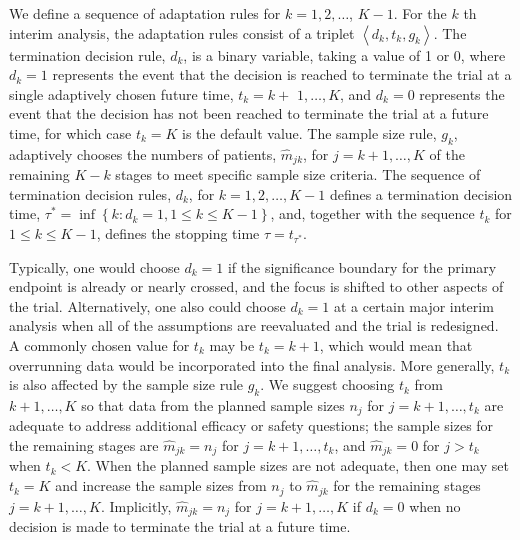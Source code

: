 \documentclass[10pt]{article}
\begin{document}
We define a sequence of adaptation rules for $k=1,2, \ldots$, $K-1$. For the $k$ th interim analysis, the adaptation rules consist of a triplet $\left\langle d_{k}, t_{k}, g_{k}\right\rangle$. The termination decision rule, $d_{k}$, is a binary variable, taking a value of 1 or 0, where $d_{k}=1$ represents the event that the decision is reached to terminate the trial at a single adaptively chosen future time, $t_{k}=k+$ $1, \ldots, K$, and $d_{k}=0$ represents the event that the decision has not been reached to terminate the trial at a future time, for which case $t_{k}=K$ is the default value. The sample size rule, $g_{k}$, adaptively chooses the numbers of patients, $\hat{m}_{j k}$, for $j=k+1, \ldots, K$ of the remaining $K-k$ stages to meet specific sample size criteria. The sequence of termination decision rules, $d_{k}$, for $k=1,2, \ldots, K-1$ defines a termination decision time, $\tau^{*}=\inf \left\{k: d_{k}=1,1 \leq k \leq K-1\right\}$, and, together with the sequence $t_{k}$ for $1 \leq k \leq K-1$, defines the stopping time $\tau=t_{\tau^{*}}$.

Typically, one would choose $d_{k}=1$ if the significance boundary for the primary endpoint is already or nearly crossed, and the focus is shifted to other aspects of the trial. Alternatively, one also could choose $d_{k}=1$ at a certain major interim analysis when all of the assumptions are reevaluated and the trial is redesigned. A commonly chosen value for $t_{k}$ may be $t_{k}=k+1$, which would mean that overrunning data would be incorporated into the final analysis. More generally, $t_{k}$ is also affected by the sample size rule $g_{k}$. We suggest choosing $t_{k}$ from $k+1, \ldots, K$ so that data from the planned sample sizes $n_{j}$ for $j=k+1, \ldots, t_{k}$ are adequate to address additional efficacy or safety questions; the sample sizes for the remaining stages are $\hat{m}_{j k}=n_{j}$ for $j=k+1, \ldots, t_{k}$, and $\hat{m}_{j k}=0$ for $j>t_{k}$ when $t_{k}<K$. When the planned sample sizes are not adequate, then one may set $t_{k}=K$ and increase the sample sizes from $n_{j}$ to $\hat{m}_{j k}$ for the remaining stages $j=k+1, \ldots, K$. Implicitly, $\hat{m}_{j k}=n_{j}$ for $j=k+1, \ldots, K$ if $d_{k}=0$ when no decision is made to terminate the trial at a future time.
\end{document}
